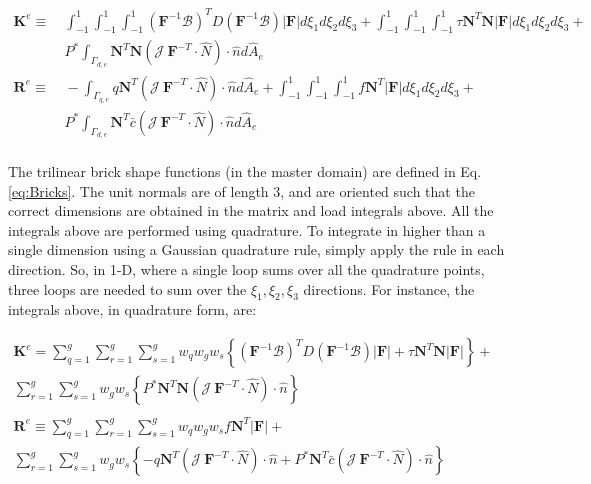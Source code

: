 \documentclass[10pt]{article}
\begin{document}
\begin{equation}
\label{eq:FEWeakForm_element2}
\begin{aligned}
\textbf{K}^e\equiv&\ \int_{-1}^{1}\int_{-1}^{1}\int_{-1}^{1}(\textbf{F}^{-1}\mathscr{B})^TD(\textbf{F}^{-1}\mathscr{B}) |\textbf{F}|d\xi_1d\xi_2d\xi_3+\int_{-1}^{1}\int_{-1}^{1}\int_{-1}^{1}\tau \textbf{N}^T\textbf{N} |\textbf{F}|d\xi_1d\xi_2d\xi_3+\quad\\
&\ P^{*}\int_{\Gamma_{d,e}}\textbf{N}^T\textbf{N} (\mathscr{J}\ \textbf{F}^{-T}\cdot\hat{N})\cdot\hat{n}d\hat{A}_e\\
\textbf{R}^e\equiv&\ -\int_{\Gamma_{q,e}}q\textbf{N}^T(\mathscr{J}\ \textbf{F}^{-T}\cdot\hat{N})\cdot\hat{n}d\hat{A}_e+\int_{-1}^{1}\int_{-1}^{1}\int_{-1}^{1}f\textbf{N}^T|\textbf{F}|d\xi_1d\xi_2d\xi_3+\quad\\
&\ P^{*}\int_{\Gamma_{d,e}}\textbf{N}^T\bar{c}(\mathscr{J}\ \textbf{F}^{-T}\cdot\hat{N})\cdot\hat{n}d\hat{A}_e\\
\end{aligned}
\end{equation}

The trilinear brick shape functions (in the master domain) are defined in Eq. \eqref{eq:Bricks}. The unit normals are of length 3, and are oriented such that the correct dimensions are obtained in the matrix and load integrals above. All the integrals above are performed using quadrature. To integrate in higher than a single dimension using a Gaussian quadrature rule, simply apply the rule in each direction. So, in 1-D, where a single loop sums over all the quadrature points, three loops are needed to sum over the \(\xi_1,\xi_2,\xi_3\) directions. For instance, the integrals above, in quadrature form, are:

\begin{equation}
\label{eq:FEWeakForm_element3}
\begin{aligned}
\textbf{K}^e=\sum_{q=1}^g\sum_{r=1}^g\sum_{s=1}^gw_qw_gw_s\left\{(\textbf{F}^{-1}\mathscr{B})^TD(\textbf{F}^{-1}\mathscr{B}) |\textbf{F}|+\tau \textbf{N}^T\textbf{N} |\textbf{F}|\right\} +\quad\\
\sum_{r=1}^g\sum_{s=1}^gw_gw_s\left\{P^{*}\textbf{N}^T\textbf{N} (\mathscr{J}\ \textbf{F}^{-T}\cdot\hat{N})\cdot\hat{n}\right\}\\
\ \\
\textbf{R}^e\equiv\sum_{q=1}^g\sum_{r=1}^g\sum_{s=1}^gw_qw_gw_sf\textbf{N}^T|\textbf{F}|+\quad\\
\sum_{r=1}^g\sum_{s=1}^gw_gw_s\left\{-q\textbf{N}^T(\mathscr{J}\ \textbf{F}^{-T}\cdot\hat{N})\cdot\hat{n}+P^{*}\textbf{N}^T\bar{c}(\mathscr{J}\ \textbf{F}^{-T}\cdot\hat{N})\cdot\hat{n}\right\}\\
\end{aligned}
\end{equation}
\end{document}

